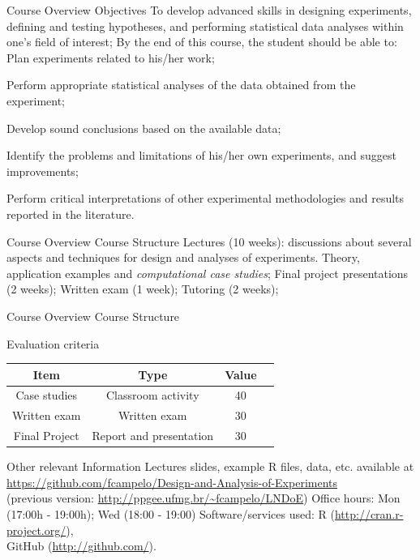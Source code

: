 \documentclass[t]{beamer}
\begin{document}
\begin{ftst}
{Course Overview}
{Objectives}
\bitems To develop advanced skills in designing experiments, defining and testing hypotheses, and performing statistical data analyses within one's field of interest;
\spitem By the end of this course, the student should be able to:
\bitems Plan experiments related to his/her work;
\item Perform appropriate statistical analyses of the data obtained from the experiment;
\item Develop sound conclusions based on the available data;
\item Identify the problems and limitations of his/her own experiments, and suggest improvements;
\item Perform critical interpretations of other experimental methodologies and results reported in the literature.
\eitem\eitem
\end{ftst}


\begin{ftst}
{Course Overview}
{Course Structure}
\bitems Lectures (10 weeks): discussions about several aspects and techniques for design and analyses of experiments. Theory, application examples and \textit{computational case studies}; 
\spitem Final project presentations (2 weeks);
\spitem Written exam (1 week);
\spitem Tutoring (2 weeks);
\eitem
\end{ftst}


\begin{ftst}
{Course Overview}
{Course Structure}
\begin{block}{Evaluation criteria}
	\begin{center}
		\small
		\begin{tabular}{cccc} \hline
			\textbf{Item}	& \textbf{Type}	&Value\\
			\hline
			Case studies		& Classroom activity		&40\\
			Written exam		& Written exam	&30\\
			Final Project		& Report and presentation		&30\\
			\hline
		\end{tabular}
	\end{center}
\end{block}

\begin{block}{Other relevant Information}
	\bitems Lectures slides, example R files, data, etc. available at \\
	{\scriptsize \url{https://github.com/fcampelo/Design-and-Analysis-of-Experiments}}\\
	{\scriptsize (previous version: \url{http://ppgee.ufmg.br/~fcampelo/LNDoE})}
	\spitem Office hours: Mon (17:00h - 19:00h); Wed (18:00 - 19:00)
	\spitem Software/services used: R ({\scriptsize\url{http://cran.r-project.org/}}),\\GitHub ({\scriptsize\url{http://github.com/}}).
	\eitem
\end{block}
\end{ftst}
\end{document}
